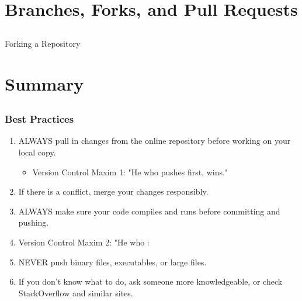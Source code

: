 \documentclass[]{beamer}
\begin{document}
\section{Branches, Forks, and Pull Requests}
\subsection{}

\begin{frame}[t]{Forking a Repository}

\end{frame}

\section{Summary}
\subsection{}
\begin{frame}[t]\frametitle{Best Practices}
  \begin{block}{}
    \begin{enumerate}
      \item ALWAYS pull in changes from the online repository before working on your local copy. 
        \begin{itemize}
          \item Version Control Maxim 1: "He who pushes first, wins."
        \end{itemize}
      \item If there is a conflict, merge your changes responsibly.
      \item ALWAYS make sure your code compiles and runs before committing and pushing.
         \item Version Control Maxim 2: "He who : 
      \item NEVER push binary files, executables, or large files. 
      \item If you don't know what to do, ask someone more knowledgeable, or check StackOverflow and similar sites.
    \end{enumerate}
  \end{block}
\end{frame}
\end{document}
